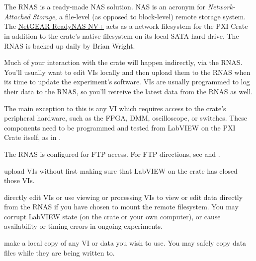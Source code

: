 \section{}
\label{sec:eq_readynas}

The \gls{RNAS} is a ready-made NAS solution.  NAS is an acronym for \textit{Network-Attached Storage}, a file-level (as opposed to block-level) remote storage system.  The \href{http://www.netgear.com/Products/Storage/ReadyNASNVPlus.aspx}{NetGEAR ReadyNAS NV+} acts as a network filesystem for the \gls{PXI Crate} in addition to the crate's native filesystem on its local SATA hard drive.  The \gls{RNAS} is backed up daily by Brian Wright.

Much of your interaction with the crate will happen indirectly, via the \gls{RNAS}.  You'll usually want to edit VIs locally and then upload them to the \gls{RNAS} when its time to update the experiment's software.  VIs are usually programmed to log their data to the \gls{RNAS}, so you'll retreive the latest data from the \gls{RNAS} as well.

The main exception to this is any VI which requires access to the crate's peripheral hardware, such as the FPGA, DMM, oscilloscope, or switches.  These components need to be programmed and tested from LabVIEW on the PXI Crate itself, as in .

The \gls{RNAS} is configured for FTP access.  
For FTP directions, see  and .

\begin{pleasedonot} upload VIs without first making sure that LabVIEW on the crate has closed those VIs.\end{pleasedonot}

\begin{pleasedonot} directly edit VIs or use viewing or processing VIs to view or edit data directly from the \gls{RNAS} if you have chosen to mount the remote filesystem.  You may corrupt LabVIEW state (on the crate or your own computer), or cause availability or timing errors in ongoing experiments.\end{pleasedonot}

\begin{pleasedo} make a local copy of any VI or data you wish to use.  You may safely copy data files while they are being written to.\end{pleasedo}



